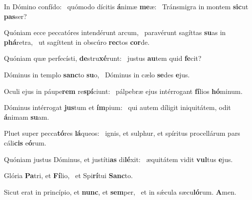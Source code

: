 \item In Dómino confído:~\pscross{} quómodo dícitis \textbf{á}nimæ \textbf{me}æ:~\psstar{} Tránsmigra in montem \textbf{sic}ut \textbf{pas}ser?
\item Quóniam ecce peccatóres intendérunt arcum,~\pscross{} paravérunt sagíttas \textbf{su}as in \textbf{phá}retra,~\psstar{} ut sagíttent in obscúro \textbf{rec}tos \textbf{cor}de.
\item Quóniam quæ perfecísti, \textbf{de}stru\textbf{xé}runt:~\psstar{} justus \textbf{au}tem quid \textbf{fe}cit?
\item Dóminus in templo \textbf{sanc}to \textbf{su}o,~\psstar{} Dóminus in cælo \textbf{se}des \textbf{e}jus.
\item Oculi ejus in páupe\textbf{rem} re\textbf{spí}ciunt:~\psstar{} pálpebræ ejus intérrogant \textbf{fí}lios \textbf{hó}minum.
\item Dóminus intérrogat \textbf{jus}tum et \textbf{ím}pium:~\psstar{} qui autem díligit iniquitátem, odit \textbf{á}nimam \textbf{su}am.
\item Pluet super pecca\textbf{tó}res \textbf{lá}queos:~\psstar{} ignis, et sulphur, et spíritus procellárum pars cáli\textbf{cis} e\textbf{ó}rum.
\item Quóniam justus Dóminus, et justíti\textbf{as} di\textbf{lé}xit:~\psstar{} æquitátem vidit \textbf{vul}tus \textbf{e}jus.
\item Glória \textbf{Pa}tri, et \textbf{Fí}lio,~\psstar{} et Spi\textbf{rí}tui \textbf{Sanc}to.
\item Sicut erat in princípio, et \textbf{nunc}, et \textbf{sem}per,~\psstar{} et in sǽcula sæcu\textbf{ló}rum. \textbf{A}men.
